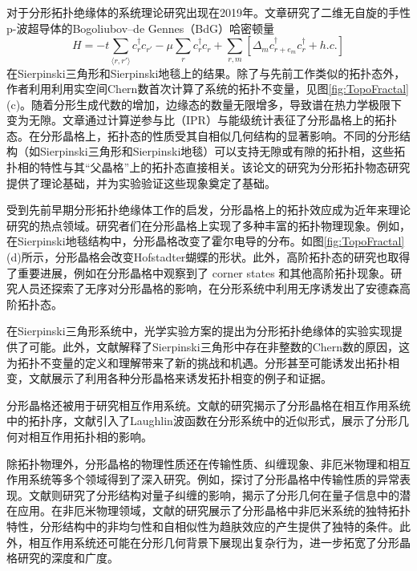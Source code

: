 对于分形拓扑绝缘体的系统理论研究出现在2019年\cite{pai2019topological}。文章研究了二维无自旋的手性p-波超导体的Bogoliubov–de Gennes（BdG）哈密顿量
\begin{equation}
    H = -t \sum_{\langle r, r' \rangle} c_r^\dagger c_{r'} - \mu \sum_{r} c_r^\dagger c_r + \sum_{r, m} \left[ \Delta_m c_{r+e_m}^\dagger c_r^\dagger + h.c. \right]
\end{equation}
在Sierpinski三角形和Sierpinski地毯上的结果。除了与先前工作类似的拓扑态外，作者利用利用实空间Chern数首次计算了系统的拓扑不变量，见图\ref{fig:TopoFractal}(c)。随着分形生成代数的增加，边缘态的数量无限增多，导致谱在热力学极限下变为无隙。文章通过计算逆参与比（IPR）与能级统计表征了分形晶格上的拓扑态。在分形晶格上，拓扑态的性质受其自相似几何结构的显著影响。不同的分形结构（如Sierpinski三角形和Sierpinski地毯）可以支持无隙或有隙的拓扑相，这些拓扑相的特性与其“父晶格”上的拓扑态直接相关。该论文的研究为分形拓扑物态研究提供了理论基础，并为实验验证这些现象奠定了基础。

受到先前早期分形拓扑绝缘体工作的启发，分形晶格上的拓扑效应成为近年来理论研究的热点领域。研究者们在分形晶格上实现了多种丰富的拓扑物理现象。例如，在Sierpinski地毯结构中，分形晶格改变了霍尔电导的分布\cite{fremling2020existence, iliasov2020hall}。如图\ref{fig:TopoFractal}(d)所示，分形晶格会改变Hofstadter蝴蝶的形状。此外，高阶拓扑态的研究也取得了重要进展，例如在分形晶格中观察到了 corner states 和其他高阶拓扑现象\cite{manna2022higher,lage2024corner}。研究人员还探索了无序对分形晶格的影响，在分形系统中利用无序诱发出了安德森高阶拓扑态\cite{chen2023higher}。

在Sierpinski三角形系统中，光学实验方案的提出为分形拓扑绝缘体的实验实现提供了可能\cite{yang2020photonic}。此外，文献\cite{chen2023kitaev}解释了Sierpinski三角形中存在非整数的Chern数的原因，这为拓扑不变量的定义和理解带来了新的挑战和机遇。分形甚至可能诱发出拓扑相变，文献\cite{eek2024fractality}展示了利用各种分形晶格来诱发拓扑相变的例子和证据。

分形晶格还被用于研究相互作用系统。文献\cite{wang2022new}的研究揭示了分形晶格在相互作用系统中的拓扑序，文献\cite{jaworowski2023approximate}引入了Laughlin波函数在分形系统中的近似形式，展示了分形几何对相互作用拓扑相的影响。

除拓扑物理外，分形晶格的物理性质还在传输性质、纠缠现象、非厄米物理和相互作用系统等多个领域得到了深入研究。例如，\cite{guglielmon2019inducing, rojo2024anomalous}探讨了分形晶格中传输性质的异常表现。文献\cite{zhou2024entanglement}则研究了分形结构对量子纠缠的影响，揭示了分形几何在量子信息中的潜在应用。在非厄米物理领域，文献\cite{sun2024non,manna2023inner}的研究展示了分形晶格中非厄米系统的独特拓扑特性，分形结构中的非均匀性和自相似性为趋肤效应的产生提供了独特的条件。此外，相互作用系统还可能在分形几何背景下展现出复杂行为\cite{conte2024fractal}，进一步拓宽了分形晶格研究的深度和广度。

